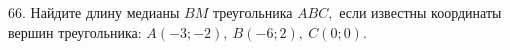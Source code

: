 66. Найдите длину медианы $BM$ треугольника $ABC,$ если известны координаты вершин треугольника: $A(-3;-2),\ B(-6;2),\ C(0;0).$\\
